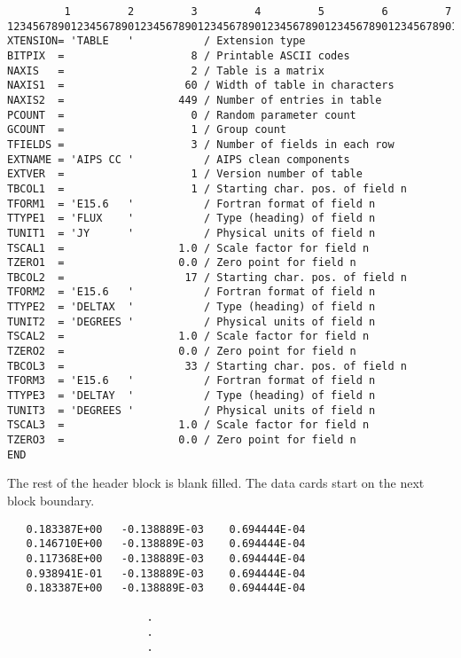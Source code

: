\begin{verbatim}
         1         2         3         4         5         6         7
12345678901234567890123456789012345678901234567890123456789012345678901
XTENSION= 'TABLE   '           / Extension type
BITPIX  =                    8 / Printable ASCII codes
NAXIS   =                    2 / Table is a matrix
NAXIS1  =                   60 / Width of table in characters
NAXIS2  =                  449 / Number of entries in table
PCOUNT  =                    0 / Random parameter count
GCOUNT  =                    1 / Group count
TFIELDS =                    3 / Number of fields in each row
EXTNAME = 'AIPS CC '           / AIPS clean components
EXTVER  =                    1 / Version number of table
TBCOL1  =                    1 / Starting char. pos. of field n
TFORM1  = 'E15.6   '           / Fortran format of field n
TTYPE1  = 'FLUX    '           / Type (heading) of field n
TUNIT1  = 'JY      '           / Physical units of field n
TSCAL1  =                  1.0 / Scale factor for field n
TZERO1  =                  0.0 / Zero point for field n
TBCOL2  =                   17 / Starting char. pos. of field n
TFORM2  = 'E15.6   '           / Fortran format of field n
TTYPE2  = 'DELTAX  '           / Type (heading) of field n
TUNIT2  = 'DEGREES '           / Physical units of field n
TSCAL2  =                  1.0 / Scale factor for field n
TZERO2  =                  0.0 / Zero point for field n
TBCOL3  =                   33 / Starting char. pos. of field n
TFORM3  = 'E15.6   '           / Fortran format of field n
TTYPE3  = 'DELTAY  '           / Type (heading) of field n
TUNIT3  = 'DEGREES '           / Physical units of field n
TSCAL3  =                  1.0 / Scale factor for field n
TZERO3  =                  0.0 / Zero point for field n
END

\end{verbatim}
The rest of the header block is blank filled.  The data cards start on
the next block boundary.

\begin{verbatim}
   0.183387E+00   -0.138889E-03    0.694444E-04
   0.146710E+00   -0.138889E-03    0.694444E-04
   0.117368E+00   -0.138889E-03    0.694444E-04
   0.938941E-01   -0.138889E-03    0.694444E-04
   0.183387E+00   -0.138889E-03    0.694444E-04

                      .
                      .
                      .

\end{verbatim}

